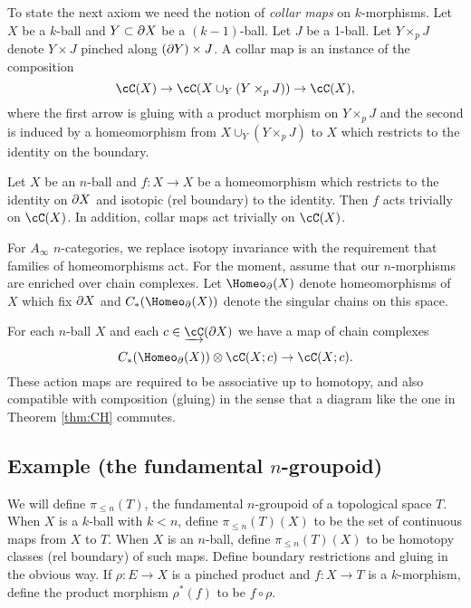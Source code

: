 \documentclass{pnastwo}
\begin{document}
\begin{article}
To state the next axiom we need the notion of {\it collar maps} on $k$-morphisms.
Let $X$ be a $k$-ball and $Y\subset\partial X$ be a $(k{-}1)$-ball.
Let $J$ be a 1-ball.
Let $Y\times_p J$ denote $Y\times J$ pinched along $(\partial Y)\times J$.
A collar map is an instance of the composition
\[
	\cC(X) \to \cC(X\cup_Y (Y\times_p J)) \to \cC(X) ,
\]
where the first arrow is gluing with a product morphism on $Y\times_p J$ and
the second is induced by a homeomorphism from $X\cup_Y (Y\times_p J)$ to $X$ which restricts
to the identity on the boundary.


\begin{axiom}
\label{axiom:extended-isotopies}
Let $X$ be an $n$-ball and $f: X\to X$ be a homeomorphism which restricts
to the identity on $\partial X$ and isotopic (rel boundary) to the identity.
Then $f$ acts trivially on $\cC(X)$.
In addition, collar maps act trivially on $\cC(X)$.
\end{axiom}

\smallskip

For $A_\infty$ $n$-categories, we replace
isotopy invariance with the requirement that families of homeomorphisms act.
For the moment, assume that our $n$-morphisms are enriched over chain complexes.
Let $\Homeo_\bd(X)$ denote homeomorphisms of $X$ which fix $\partial X$ and
$C_*(\Homeo_\bd(X))$ denote the singular chains on this space.


\begin{axiom}
\label{axiom:families}
For each $n$-ball $X$ and each $c\in \cl{\cC}(\bd X)$ we have a map of chain complexes
\[
	C_*(\Homeo_\bd(X))\tensor \cC(X; c) \to \cC(X; c) .
\]
These action maps are required to be associative up to homotopy,
and also compatible with composition (gluing) in the sense that
a diagram like the one in Theorem \ref{thm:CH} commutes.
\end{axiom}

\subsection{Example (the fundamental $n$-groupoid)}
We will define $\pi_{\le n}(T)$, the fundamental $n$-groupoid of a topological space $T$.
When $X$ is a $k$-ball with $k<n$, define $\pi_{\le n}(T)(X)$
to be the set of continuous maps from $X$ to $T$.
When $X$ is an $n$-ball, define $\pi_{\le n}(T)(X)$ to be homotopy classes (rel boundary) of such maps.
Define boundary restrictions and gluing in the obvious way.
If $\rho:E\to X$ is a pinched product and $f:X\to T$ is a $k$-morphism,
define the product morphism $\rho^*(f)$ to be $f\circ\rho$.


\end{article}
\end{document}
